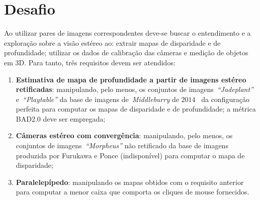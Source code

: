 \section{Desafio}
    \label{sec:desa}
Ao utilizar pares de imagens correspondentes deve-se buscar o entendimento e a exploração sobre a visão estéreo ao: extrair mapas de disparidade e de profundidade; utilizar os dados de calibração das câmeras e medição de objetos em 3D. Para tanto, três requisitos devem ser atendidos:

\begin{enumerate}
    \item \textbf{Estimativa de mapa de profundidade a partir de imagens estéreo retificadas}: manipulando, pelo menos, os conjuntos de  imagens~\emph{``Jadeplant''} e~\emph{``Playtable''} da base de imagens de~\emph{Middleburry} de $2014$~\cite{Middleburry2014} da configuração perfeita para computar os mapas de disparidade e de profundidade; a métrica BAD2.0 deve ser empregada;
    \item \textbf{Câmeras estéreo com convergência}: manipulando, pelo menos, os conjuntos de imagens~\emph{``Morpheus''} não retificado da base de imagens produzida por Furukawa e Ponce (indisponível) para computar o mapa de disparidade;
    \item \textbf{Paralelepípedo}: manipulando os mapas obtidos com o requisito anterior para computar a menor caixa que comporta os cliques de mouse fornecidos.
\end{enumerate}